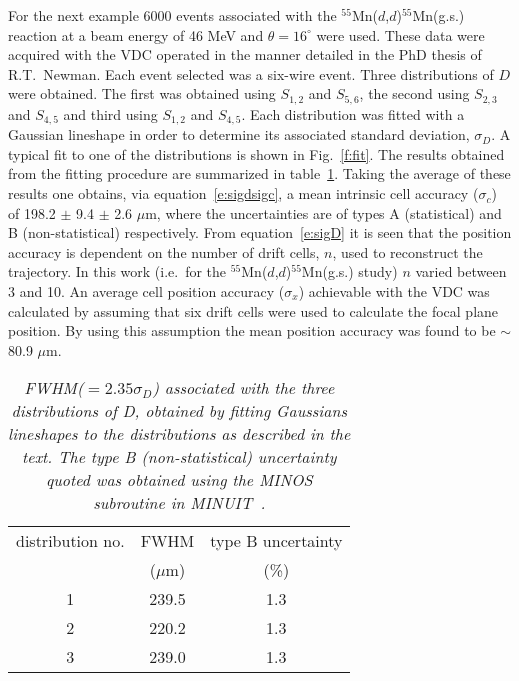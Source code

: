 \documentclass[11pt]{report}
\begin{document}
For the next example 6000 events associated with the 
$^{55}$Mn($d$,$d$)$^{55}$Mn(g.s.) reaction at a beam energy of 46 MeV and
$\theta = 16^{\circ}$ were used. 
These data were acquired with the VDC operated in the manner detailed in the PhD thesis of R.T.~Newman.
Each event selected was a six-wire event. Three distributions of $D$ were obtained. The first was
obtained using $S_{1,2}$ and $S_{5,6}$, the second using
$S_{2,3}$ and $S_{4,5}$ and third using $S_{1,2}$ and $S_{4,5}$.
Each distribution was fitted with a Gaussian lineshape  in order to determine its associated standard 
deviation, $\sigma_{D}$. A typical fit to one of the distributions is shown in Fig.~\ref{f:fit}.
The results obtained from the fitting procedure are summarized in table~\ref{t:results}.
Taking the average of these results one obtains, via equation~\ref{e:sigdsigc}, a mean intrinsic cell 
accuracy ($\sigma_{c}$)  of 198.2 $\pm$ 9.4 $\pm$ 2.6 $\mu$m, where the uncertainties
are of types A (statistical) and B (non-statistical) respectively.
From equation~\ref{e:sigD} it is seen that the position accuracy is
dependent on the number of drift cells, $n$, used to reconstruct the trajectory.
In this work (i.e.~for the $^{55}$Mn($d$,$d$)$^{55}$Mn(g.s.) study) $n$ varied between 3 and 10.
An average cell position accuracy ($\sigma_{x}$) achievable with the VDC was calculated by assuming that
six drift cells were used to calculate the focal plane position.
By using this assumption the mean position accuracy was found to be $\sim$ 80.9 $\mu$m. 

\begin{table}
\begin{center}
{\small
\begin{tabular}{|ccc|}
\hline
distribution no. & FWHM & type B uncertainty\\ 
                 &  ($\mu$m)    &   (\%) \\\hline\hline
1 & 239.5 & 1.3 \\
2 & 220.2 & 1.3 \\
3 & 239.0 & 1.3 \\\hline
\end{tabular} }
\end{center}
\caption[FWHM
 associated with distributions 
used to determine the VDC intrinsic cell accuracy.]
{{\em FWHM($ = 2.35\sigma_{D}$)
 associated with the three distributions of D, 
obtained by fitting Gaussians lineshapes to the distributions
as described in the text. The type B (non-statistical) uncertainty 
quoted was 
obtained
using the MINOS subroutine in MINUIT~\protect\cite{Jam75,Jam89}.}}
\label{t:results}
\end{table}
\end{document}
